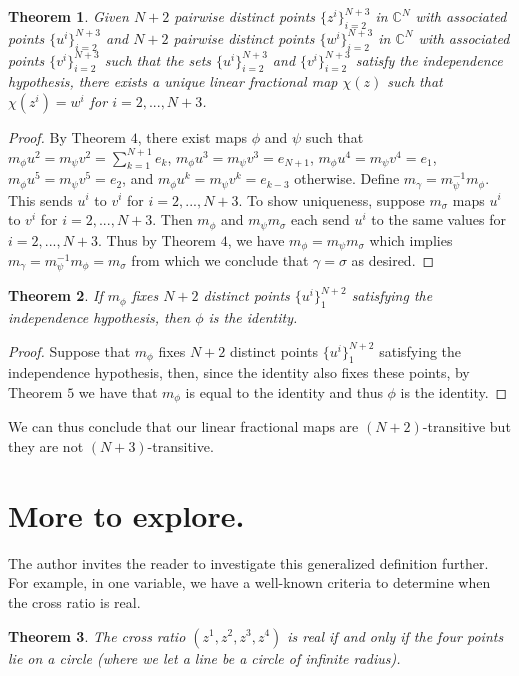 \documentclass{amsart}
\theoremstyle{theorem}
\newtheorem{theorem}{Theorem}
\theoremstyle{lemma}
\theoremstyle{definition}
\begin{document}
\begin{theorem}
Given $N+2$ pairwise distinct points $\{z^i\}_{i=2}^{N+3}$ in $\mathbb{C}^N$ with associated points $\{u^i\}_{i=2}^{N+3}$ and $N+2$ pairwise distinct points $\{w^i\}_{i=2}^{N+3}$ in $\mathbb{C}^N$ with associated points $\{v^i\}_{i=2}^{N+3}$ such that the sets $\{u^i\}_{i=2}^{N+3}$ and $\{v^i\}_{i=2}^{N+3}$ satisfy the independence hypothesis, there exists a unique linear fractional map $\chi(z)$ such that $\chi(z^i)=w^i$ for $i=2,...,N+3$.
\end{theorem}

\begin{proof}
By Theorem $4$, there exist maps $\phi$ and $\psi$ such that $m_{\phi}u^2=m_{\psi}v^2=\sum_{k=1}^{N+1}e_k$, $m_{\phi}u^3=m_{\psi}v^3=e_{N+1}$, $m_{\phi}u^4=m_{\psi}v^4=e_1$, $m_{\phi}u^5=m_{\psi}v^5=e_2$, and $m_{\phi}u^k=m_{\psi}v^k=e_{k-3}$ otherwise. Define $m_{\gamma}=m_{\psi}^{-1}m_{\phi}$. This sends $u^i$ to $v^i$ for $i=2,...,N+3$. To show uniqueness, suppose $m_{\sigma}$ maps $u^i$ to $v^i$ for $i=2,...,N+3$. Then $m_{\phi}$ and $m_{\psi}m_{\sigma}$ each send $u^i$ to the same values for $i=2,...,N+3$. Thus by Theorem $4$, we have $m_{\phi}=m_{\psi}m_{\sigma}$ which implies $m_{\gamma}=m_{\psi}^{-1}m_{\phi}=m_{\sigma}$ from which we conclude that $\gamma=\sigma$ as desired.
\end{proof}

\begin{theorem}
If $m_{\phi}$ fixes $N+2$ distinct points $\{u^i\}_1^{N+2}$ satisfying the independence hypothesis, then $\phi$ is the identity.
\end{theorem}

\begin{proof}
Suppose that $m_{\phi}$ fixes $N+2$ distinct points $\{u^i\}_1^{N+2}$ satisfying the independence hypothesis, then, since the identity also fixes these points, by Theorem $5$ we have that $m_{\phi}$ is equal to the identity and thus $\phi$ is the identity.
\end{proof}

We can thus conclude that our linear fractional maps are $(N+2)$-transitive but they are not $(N+3)$-transitive.

\section{More to explore.}

The author invites the reader to investigate  this generalized definition further. For example, in one variable, we have a well-known criteria to determine when the cross ratio is real.
\begin{theorem}
The cross ratio $(z^1,z^2,z^3,z^4)$  is real if and only if the four points lie on a circle (where we let a line be a circle of infinite radius). 
\end{theorem}
\end{document}
